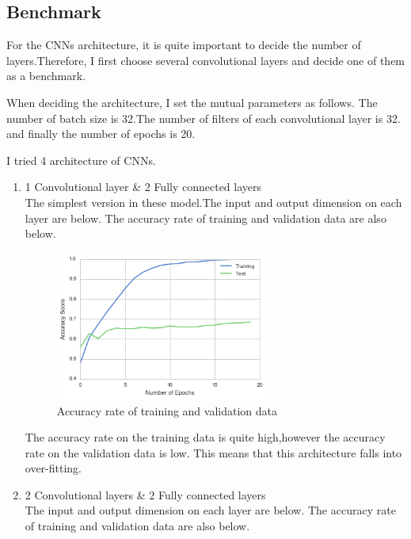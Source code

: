 \subsection{Benchmark}

For the CNNs architecture, it is quite important to decide the number of layers.Therefore, I first choose several convolutional layers and decide one of them as a benchmark.

When deciding the architecture, I set the mutual parameters as follows.
The number of batch size is 32.The number of filters of each convolutional layer is 32. and finally the number of epochs is 20.

I tried 4 architecture of CNNs.

\begin{enumerate}
 \item 1 Convolutional layer \& 2 Fully connected layers \\
 The simplest version in these model.The input and output dimension on each layer are below.
 The accuracy rate of training and validation data are also below.
 
 \begin{figure}[H]

	\begin{center}
	\includegraphics[width=7cm]{picture/1layer_cnn.png}
	\caption{Accuracy rate of training and validation data}
	\end{center}
	\label{fig:eight}

\end{figure}
 
 The accuracy rate on the training data is quite high,however the accuracy rate on the validation data is low. This means that this architecture falls into over-fitting.
 
 
 \item 2 Convolutional layers \& 2 Fully connected layers \\
 The input and output dimension on each layer are below.
 The accuracy rate of training and validation data are also below.
 

\end{enumerate}
